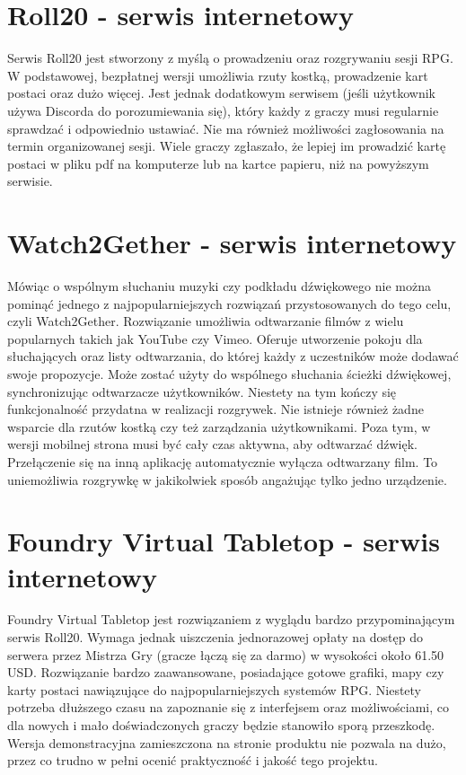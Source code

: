 \documentclass[shortabstract,inz]{iithesis}
\begin{document}
		\section{Roll20 - serwis internetowy}
		Serwis Roll20\cite{roll20} jest stworzony z myślą o prowadzeniu oraz rozgrywaniu sesji RPG. W podstawowej, bezpłatnej wersji umożliwia rzuty kostką, prowadzenie kart postaci oraz dużo więcej. Jest jednak dodatkowym serwisem (jeśli użytkownik używa Discorda do porozumiewania się), który każdy z graczy musi regularnie sprawdzać i odpowiednio ustawiać. Nie ma również możliwości zagłosowania na termin organizowanej sesji. Wiele graczy zgłaszało, że lepiej im prowadzić kartę postaci w pliku pdf na komputerze lub na kartce papieru, niż na powyższym serwisie.
		\section{Watch2Gether - serwis internetowy}
		\label{w2g}
		Mówiąc o wspólnym słuchaniu muzyki czy podkładu dźwiękowego nie można pominąć jednego z najpopularniejszych rozwiązań przystosowanych do tego celu, czyli Watch2Gether. Rozwiązanie umożliwia odtwarzanie filmów z wielu popularnych takich jak YouTube czy Vimeo. Oferuje utworzenie pokoju dla słuchających oraz listy odtwarzania, do której każdy z uczestników może dodawać swoje propozycje. Może zostać użyty do wspólnego słuchania ścieżki dźwiękowej, synchronizując odtwarzacze użytkowników. Niestety na tym kończy się funkcjonalność przydatna w realizacji rozgrywek. Nie istnieje również żadne wsparcie dla rzutów kostką czy też zarządzania użytkownikami. Poza tym, w wersji mobilnej strona musi być cały czas aktywna, aby odtwarzać dźwięk. Przełączenie się na inną aplikację automatycznie wyłącza odtwarzany film. To uniemożliwia rozgrywkę w jakikolwiek sposób angażując tylko jedno urządzenie. 
		\section{Foundry Virtual Tabletop - serwis internetowy}
		Foundry Virtual Tabletop jest rozwiązaniem z wyglądu bardzo przypominającym serwis Roll20. Wymaga jednak uiszczenia jednorazowej opłaty na dostęp do serwera przez Mistrza Gry (gracze łączą się za darmo) w wysokości około 61.50 USD. Rozwiązanie bardzo zaawansowane, posiadające gotowe grafiki, mapy czy karty postaci nawiązujące do najpopularniejszych systemów RPG. Niestety potrzeba dłuższego czasu na zapoznanie się z interfejsem oraz możliwościami, co dla nowych i mało doświadczonych graczy będzie stanowiło sporą przeszkodę. Wersja demonstracyjna zamieszczona na stronie produktu nie pozwala na dużo, przez co trudno w pełni ocenić praktyczność i jakość tego projektu.
		
\end{document}
